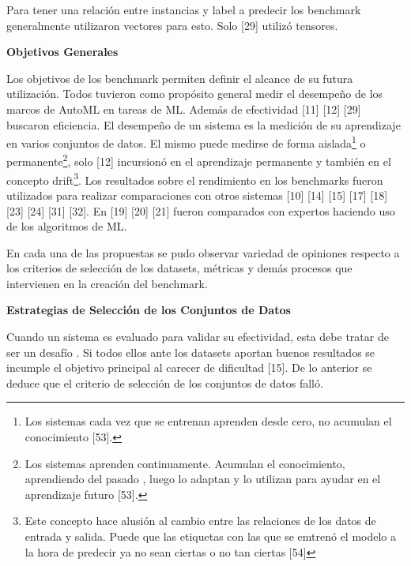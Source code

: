Para tener una relación entre instancias y label a predecir los benchmark generalmente utilizaron vectores para esto. Solo [29] utilizó tensores.

\begin{flushleft} 
    {\large { \textbf{Objetivos Generales}}}\label{subsection:obj_AutoML}
\end{flushleft}

Los objetivos de los benchmark permiten definir el alcance de su futura utilización.  Todos tuvieron como propósito general medir el desempeño de los marcos de AutoML 
en tareas de ML. Además de efectividad [11] [12] [29] buscaron eficiencia.  El desempeño de un sistema es la medición de su aprendizaje en varios conjuntos de datos. El 
mismo puede medirse de forma aislada\footnote{Los sistemas cada vez que se entrenan aprenden desde cero, no acumulan el conocimiento [53].} o permanente\footnote{Los sistemas 
aprenden continuamente. Acumulan el conocimiento, aprendiendo del pasado , luego lo adaptan y lo utilizan para ayudar en el aprendizaje futuro [53].}, solo [12] incursionó 
en el aprendizaje permanente y también en el concepto drift\footnote{Este concepto hace alusión al cambio entre las relaciones de los datos de entrada y salida. Puede que las 
etiquetas con las que se emtrenó el modelo a la hora de predecir ya no sean ciertas o no tan ciertas [54] }. Los resultados sobre el rendimiento en los benchmarks fueron utilizados para realizar 
comparaciones con otros sistemas [10] [14] [15] [17] [18] [23] [24] [31] [32]. En [19] [20] [21] fueron comparados con expertos haciendo uso de los 
algoritmos de ML.

En cada una de las propuestas se pudo observar variedad de opiniones respecto a los criterios de selección de los datasets, métricas y demás procesos que intervienen en 
la creación del benchmark.

\begin{flushleft} 
    {\large { \textbf{Estrategias de Selección de los Conjuntos de Datos}}}\label{subsection:sel_conj_AutoML}
\end{flushleft}


Cuando un sistema es evaluado para validar su efectividad, esta debe tratar de ser un desafío . Si todos ellos ante los 
datasets aportan buenos resultados se incumple el objetivo principal al carecer de dificultad [15]. De lo anterior se deduce que el criterio de selección 
de los conjuntos de datos falló.

